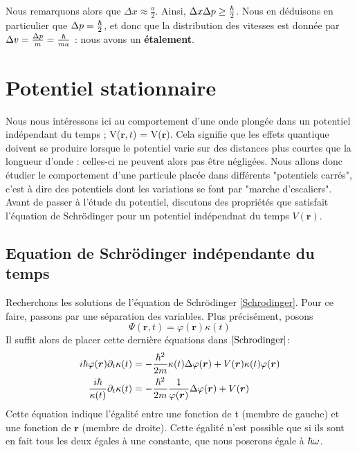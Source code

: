 \documentclass[../notesdecours]{subfiles}
\begin{document}

Nous remarquons alors que $\Delta x \approx \frac{a}{2}$. Ainsi, $\Delta x\Delta p \geq \frac{\hbar}{2}$. Nous en déduisons en particulier que $\Delta p = \frac{\hbar}{2}$, et donc que la distribution des vitesses est donnée par $\Delta v = \frac{\Delta p}{m} = \frac{\hbar}{ma}$ : nous avons un \textbf{étalement}.

\newpage
\section{Potentiel stationnaire}
Nous nous intéressons ici au comportement d'une onde plongée dans un potentiel indépendant du temps ; V($\bm{r},t$) = V($\bm{r}$). Cela signifie que les effets quantique doivent se produire lorsque le potentiel varie sur des distances plus courtes que la longueur d'onde : celles-ci ne peuvent alors pas être négligées.  Nous allons donc étudier le comportement d'une particule placée dans différents "potentiels carrés", c'est à dire des potentiels dont les variations se font par "marche d'escaliers". Avant de passer à l'étude du potentiel, discutons des propriétés que satisfait l'équation de Schrödinger pour un potentiel indépendnat du temps $V(\bm{r})$.\\

\subsection{Equation de Schrödinger indépendante du temps}

Recherchons les solutions de l'équation de Schrödinger \eqref{Schrodinger}. Pour ce faire, passons par une séparation des variables. Plus précisément, posons
\begin{equation}
\Psi(\bm{r},t) = \varphi(\bm{r})\kappa(t)
\end{equation}
Il suffit alors de placer cette dernière équations dans $\eqref{Schrodinger}$:
\begin{align}
i \hbar \varphi(\bm{r})\partial_t \kappa(t) &= - \frac{\hbar^2}{2m} \kappa(t) \Delta \varphi(\bm{r}) + V(\bm{r})\kappa(t)\varphi(\bm{r})\\
\frac{i\hbar}{\kappa(t)} \partial_t \kappa(t) &= - \frac{\hbar^2}{2m} \frac{1}{\varphi(\bm{r})} \Delta \varphi(\bm{r}) + V(\bm{r})
\label{Séparation temporelle et spatiale}
\end{align}
Cette équation indique l'égalité entre une fonction de t (membre de gauche) et une fonction de $\bm{r}$ (membre de droite). Cette égalité n'est possible que si ils sont en fait tous les deux égales à une constante, que nous poserons égale à $\hbar \omega$.\\
\end{document}

